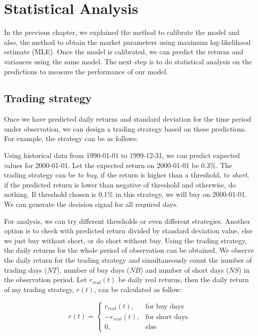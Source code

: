 \chapter{Statistical Analysis}
In the previous chapter, we explained the method to calibrate the model and also, the method to obtain the market parameters using maximum log-likelihood estimate (MLE). Once the model is calibrated, we can predict the returns and variances using the same model. The next step is to do statistical analysis on the predictions to measure the performance of our model.

\section{Trading strategy}
Once we have predicted daily returns and standard deviation for the time period under observation, we can design a trading strategy based on these predictions. For example, the strategy can be as follows: 

\par Using historical data from 1990-01-01 to 1999-12-31, we can predict expected values for 2000-01-01. Let the expected return on 2000-01-01 be 0.3\%. The trading strategy can be \textit{to buy}, if the return is higher than a threshold, \textit{to short}, if the predicted return is lower than negative of threshold and otherwise, do nothing. If threshold chosen is 0.1\% in this strategy, we will buy on 2000-01-01. We can generate the decision signal for all required days.\newline

For analysis, we can try different thresholds or even different strategies. Another option is to check with predicted return divided by standard deviation value, else we just buy without short, or do short without buy.
Using the trading strategy, the daily returns for the whole period of observation can be obtained. We observe the daily return for the trading strategy and simultaneously count the number of trading days ($NT$), number of buy days ($NB$) and number of short days ($NS$) in the observation period. 
Let $r_{real}(t)$ be daily real returns, then the daily return of my trading strategy, $r(t)$, can be calculated as follow:

\begin{equation} \label{eqn:ret}
r(t) = 
\begin{cases}
  r_{real}(t), & \text{for buy days} \\
  -r_{real}(t),& \text{for short days} \\
  0,  & \text{else}
\end{cases}
\end{equation}

